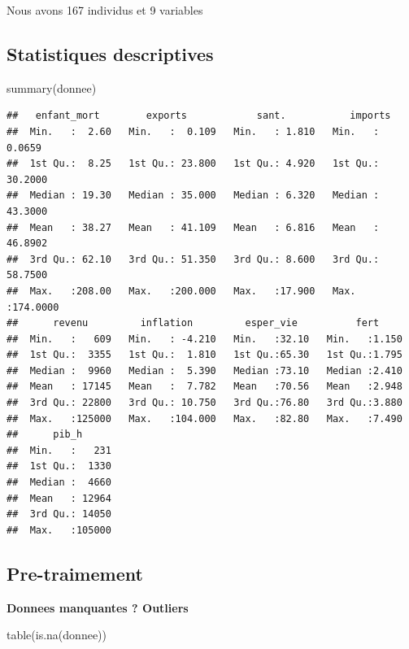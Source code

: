 \documentclass[
]{article}
\newenvironment{Shaded}{}{}
\newcommand{\FunctionTok}[1]{#1}
\newcommand{\NormalTok}[1]{#1}
\begin{document}
Nous avons 167 individus et 9 variables

\hypertarget{statistiques-descriptives}{%
\subsection{Statistiques descriptives}\label{statistiques-descriptives}}

\begin{Shaded}
\begin{Highlighting}[]
\FunctionTok{summary}\NormalTok{(donnee)}
\end{Highlighting}
\end{Shaded}

\begin{verbatim}
##   enfant_mort        exports            sant.           imports        
##  Min.   :  2.60   Min.   :  0.109   Min.   : 1.810   Min.   :  0.0659  
##  1st Qu.:  8.25   1st Qu.: 23.800   1st Qu.: 4.920   1st Qu.: 30.2000  
##  Median : 19.30   Median : 35.000   Median : 6.320   Median : 43.3000  
##  Mean   : 38.27   Mean   : 41.109   Mean   : 6.816   Mean   : 46.8902  
##  3rd Qu.: 62.10   3rd Qu.: 51.350   3rd Qu.: 8.600   3rd Qu.: 58.7500  
##  Max.   :208.00   Max.   :200.000   Max.   :17.900   Max.   :174.0000  
##      revenu         inflation         esper_vie          fert      
##  Min.   :   609   Min.   : -4.210   Min.   :32.10   Min.   :1.150  
##  1st Qu.:  3355   1st Qu.:  1.810   1st Qu.:65.30   1st Qu.:1.795  
##  Median :  9960   Median :  5.390   Median :73.10   Median :2.410  
##  Mean   : 17145   Mean   :  7.782   Mean   :70.56   Mean   :2.948  
##  3rd Qu.: 22800   3rd Qu.: 10.750   3rd Qu.:76.80   3rd Qu.:3.880  
##  Max.   :125000   Max.   :104.000   Max.   :82.80   Max.   :7.490  
##      pib_h       
##  Min.   :   231  
##  1st Qu.:  1330  
##  Median :  4660  
##  Mean   : 12964  
##  3rd Qu.: 14050  
##  Max.   :105000
\end{verbatim}

\hypertarget{pre-traimement}{%
\subsection{Pre-traimement}\label{pre-traimement}}

\textbf{Donnees manquantes ? Outliers}

\begin{Shaded}
\begin{Highlighting}[]
\FunctionTok{table}\NormalTok{(}\FunctionTok{is.na}\NormalTok{(donnee))}
\end{Highlighting}
\end{Shaded}
\end{document}
